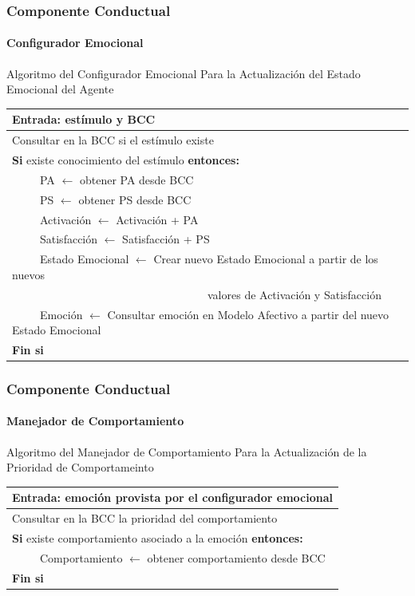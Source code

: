 \documentclass{beamer}
\begin{document}
\begin{frame}
\frametitle{Componente Conductual}
\framesubtitle{Configurador Emocional}
\centering
Algoritmo del Configurador Emocional Para la Actualización del Estado Emocional del Agente
\begin{table}[!ht]
\tiny
\begin{tabular}{l}
\hline
\textbf{Entrada:} estímulo y BCC \\
\hline
Consultar en la BCC si el estímulo existe \\
\textbf{Si} existe conocimiento del estímulo \textbf{entonces:} \\
~~~~~PA  $\leftarrow$ obtener PA desde BCC \\
~~~~~PS  $\leftarrow$ obtener PS desde BCC \\
~~~~~Activación $\leftarrow$ Activación + PA \\
~~~~~Satisfacción $\leftarrow$ Satisfacción + PS \\
~~~~~Estado Emocional $\leftarrow$ Crear nuevo Estado Emocional a partir de los nuevos \\
~~~~~~~~~~~~~~~~~~~~~~~~~~~~~~~~~~~valores de Activación y Satisfacción \\
~~~~~Emoción $\leftarrow$ Consultar emoción en Modelo Afectivo a partir del nuevo Estado Emocional \\
\textbf{Fin si} \\\hline
\end{tabular}
\end{table}
\end{frame}

\begin{frame}
\frametitle{Componente Conductual}
\framesubtitle{Manejador de Comportamiento}
\centering
Algoritmo del Manejador de Comportamiento Para la Actualización de la Prioridad de Comportameinto
\begin{table}[!ht]
\tiny
\begin{tabular}{l}
\hline
\textbf{Entrada:} emoción provista por el configurador emocional \\
\hline
Consultar en la BCC la prioridad del comportamiento \\
\textbf{Si} existe comportamiento asociado a la emoción \textbf{entonces:} \\
~~~~~Comportamiento  $\leftarrow$ obtener comportamiento desde BCC \\
\textbf{Fin si} \\\hline
\end{tabular}
\end{table}
\end{frame}
\end{document}
